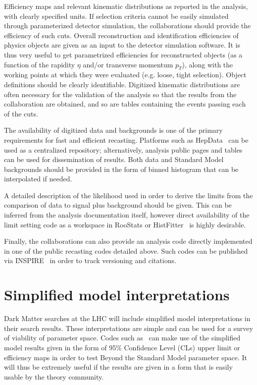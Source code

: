 Efficiency maps and relevant kinematic distributions as reported in the analysis, with clearly specified units.
If selection criteria cannot be easily simulated through parameterized detector simulation, the collaborations should provide the efficiency of such cuts. 
Overall reconstruction and identification efficiencies of physics objects are given as an input to the detector simulation software. 
It is thus very useful to get parametrized efficiencies for reconstructed objects (as a function of the rapidity $\eta$ and/or transverse momentum $p_T$), 
along with the working points at which they were evaluated (e.g. loose, tight selection). Object definitions should be clearly identifiable. 
Digitized kinematic distributions are often necessary for the validation of the analysis so that the results from the collaboration are obtained, 
and so are tables containing the events passing each of the cuts. 

The availability of digitized data and backgrounds is one of the primary requirements for fast and efficient recasting. 
Platforms such as HepData~\cite{HEPData} can be used as a centralized repository; alternatively, analysis public pages and tables can be used
for dissemination of results. Both data and Standard Model backgrounds should be provided in the form of binned histogram that can be interpolated if needed. 

A detailed description of the likelihood used in order to derive the limits from the comparison of data to signal plus background should be given. 
This can be inferred from the analysis documentation itself, however direct availability of the limit setting code as a workspace in RooStats or HistFitter~\cite{Baak:2014wma} is highly desirable. 

Finally, the collaborations can also provide an analysis code directly implemented in one of the public recasting codes detailed above. 
Such codes can be published via INSPIRE~\cite{INSPIRE} in order to track versioning and citations. 

\section{Simplified model interpretations}

Dark Matter searches at the LHC will include simplified model interpretations in their search results. These interpretations are simple and can be used for a survey of viability of parameter space. Codes such as~\cite{Kraml:2013mwa, Kraml:2014sna, Papucci:2014rja} can make use of the simplified model results given in the form of 95\% Confidence Level (CLs) upper limit  or efficiency maps in order to test Beyond the Standard Model parameter space. It will thus be extremely useful if the results are given in a form that is easily usable by the theory community. 

